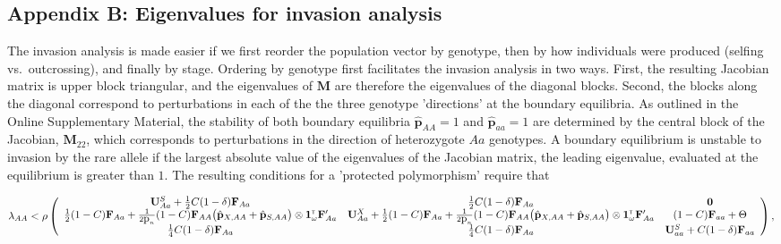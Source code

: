 \documentclass[11pt]{article}
\def\mbf#1{\mathbf{#1}}
\newcommand{\tr}{{\mbox{\tiny \sf T}}}
\begin{document}
\begin{landscape}
\section*{Appendix B: Eigenvalues for invasion analysis}
\renewcommand{\theequation}{B\arabic{equation}}
\setcounter{equation}{0}  %
\setcounter{table}{0}  %

The invasion analysis is made easier if we first reorder the population vector by genotype, then by how individuals were produced (selfing vs.~outcrossing), and finally by stage. Ordering by genotype first facilitates the invasion analysis in two ways. First, the resulting Jacobian matrix is upper block triangular, and the eigenvalues of $\mbf{M}$ are therefore the eigenvalues of the diagonal blocks. Second, the blocks along the diagonal correspond to perturbations in each of the the three genotype 'directions' at the boundary equilibria. As outlined in the Online Supplementary Material, the stability of both boundary equilibria $\hat{\mbf{p}}_{AA} = 1$ and $\hat{\mbf{p}}_{aa} = 1$ are determined by the central block of the Jacobian, $\mbf{M}_{22}$, which corresponds to perturbations in the direction of heterozygote $Aa$ genotypes. A boundary equilibrium is unstable to invasion by the rare allele if the largest absolute value of the eigenvalues of the Jacobian matrix, the leading eigenvalue, evaluated at the equilibrium is greater than $1$. The resulting conditions for a 'protected polymorphism' require that

{\footnotesize
\begin{linenomath*}
 \begin{equation} \label{eq:coexist_AA}
	\lambda_{AA} < 
			\rho\left(\begin{array}{ccc}
\mathbf{U}^S_{Aa} +\frac{1}{2} C (1 - \delta) \mbf{F}_{Aa} & \frac{1}{2} C (1 - \delta) \mbf{F}_{Aa}  & \mbf{0} \\
 \frac{1}{2} (1 - C) \mbf{F}_{Aa}+\frac{1}{2  \mbox{p}_{n}} (1 - C)\mbf{F}_{AA} \big(\hat{\mbf{p}}_{X,AA}+ \hat{\mbf{p}}_{S,AA}  \big) \otimes \mathbf{1}^\tr_{\omega} \mathbf{F}_{Aa}^\prime &\mathbf{U}^X_{Aa} + \frac{1}{2} (1 - C) \mbf{F}_{Aa} +\frac{1}{2  \mbox{p}_{n}} (1 - C)\mbf{F}_{AA} \big(\hat{\mbf{p}}_{X,AA}+ \hat{\mbf{p}}_{S,AA}  \big) \otimes \mathbf{1}^\tr_{\omega} \mathbf{F}_{Aa}^\prime & (1-C)\mbf{F}_{aa} + \Theta\\
  \frac{1}{4} C (1 - \delta) \mbf{F}_{Aa} & \frac{1}{4} C (1 - \delta) \mbf{F}_{Aa}  &\mathbf{U}^S_{aa} +C (1 - \delta) \mbf{F}_{aa}  \\ 
			\end{array} \right), \\ 
\end{equation} 
\end{linenomath*}
 
}
\end{landscape}
\end{document}
